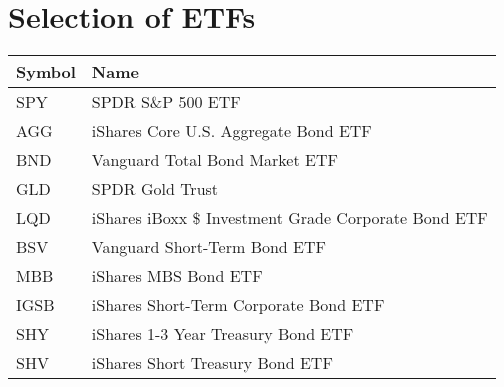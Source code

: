 \chapter{Selection of ETFs}
\label{appendix:etfs_corr}
\par
\begin{longtable}{|| m{2cm}| m{11.5cm}||}
\hline
Symbol & Name  \\ \hline \hline
SPY&SPDR S\&P 500 ETF \\ \hline
AGG&iShares Core U.S. Aggregate Bond ETF \\ \hline
BND&Vanguard Total Bond Market ETF \\ \hline
GLD&SPDR Gold Trust \\ \hline
LQD&iShares iBoxx \$ Investment Grade Corporate Bond ETF \\ \hline
BSV&Vanguard Short-Term Bond ETF \\ \hline
MBB&iShares MBS Bond ETF \\ \hline
IGSB&iShares Short-Term Corporate Bond ETF \\ \hline
SHY&iShares 1-3 Year Treasury Bond ETF \\ \hline
SHV&iShares Short Treasury Bond ETF \\ \hline

\end{longtable}